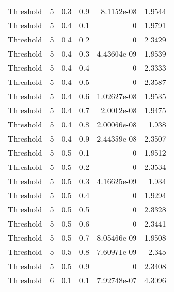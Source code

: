 \documentclass{article}
\begin{document}
\begin{longtable}[H]{lrrrrr}
 Threshold      &       5 &   0.3 &            0.9 &      8.1152e-08  &          1.9544 \\
 Threshold      &       5 &   0.4 &            0.1 &      0           &          1.9791 \\
 Threshold      &       5 &   0.4 &            0.2 &      0           &          2.3429 \\
 Threshold      &       5 &   0.4 &            0.3 &      4.43604e-09 &          1.9539 \\
 Threshold      &       5 &   0.4 &            0.4 &      0           &          2.3333 \\
 Threshold      &       5 &   0.4 &            0.5 &      0           &          2.3587 \\
 Threshold      &       5 &   0.4 &            0.6 &      1.02627e-08 &          1.9535 \\
 Threshold      &       5 &   0.4 &            0.7 &      2.0012e-08  &          1.9475 \\
 Threshold      &       5 &   0.4 &            0.8 &      2.00066e-08 &          1.938  \\
 Threshold      &       5 &   0.4 &            0.9 &      2.44359e-08 &          2.3507 \\
 Threshold      &       5 &   0.5 &            0.1 &      0           &          1.9512 \\
 Threshold      &       5 &   0.5 &            0.2 &      0           &          2.3534 \\
 Threshold      &       5 &   0.5 &            0.3 &      4.16625e-09 &          1.934  \\
 Threshold      &       5 &   0.5 &            0.4 &      0           &          1.9294 \\
 Threshold      &       5 &   0.5 &            0.5 &      0           &          2.3328 \\
 Threshold      &       5 &   0.5 &            0.6 &      0           &          2.3441 \\
 Threshold      &       5 &   0.5 &            0.7 &      8.05466e-09 &          1.9508 \\
 Threshold      &       5 &   0.5 &            0.8 &      7.60971e-09 &          2.345  \\
 Threshold      &       5 &   0.5 &            0.9 &      0           &          2.3408 \\
 Threshold      &       6 &   0.1 &            0.1 &      7.92748e-07 &          4.3096 \\

\end{longtable}
\end{document}
